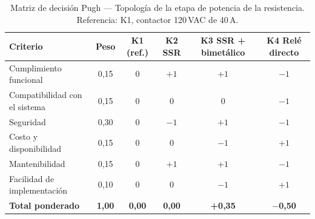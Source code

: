 \begin{table}[H]
\centering
\caption{Matriz de decisión Pugh --- Topología de la etapa de potencia de la resistencia. Referencia: K1, contactor 120\,VAC de 40\,A.}
\label{tab:pugh-potencia}
\begin{tabularx}{\textwidth}{Xccccc}
\toprule
\textbf{Criterio} & \textbf{Peso} & \textbf{K1 (ref.)} & \textbf{K2 SSR} & \textbf{K3 SSR + bimetálico} & \textbf{K4 Relé directo} \\
\midrule
Cumplimiento funcional        & 0,15 & 0 & $+1$ & $+1$ & $-1$ \\
Compatibilidad con el sistema & 0,15 & 0 & 0    & 0    & $-1$ \\
Seguridad                     & 0,30 & 0 & $-1$ & $+1$ & $-1$ \\
Costo y disponibilidad        & 0,15 & 0 & 0    & $-1$ & $+1$ \\
Mantenibilidad                & 0,15 & 0 & $+1$ & $+1$ & $-1$ \\
Facilidad de implementación   & 0,10 & 0 & 0    & $-1$ & $+1$ \\
\midrule
\textbf{Total ponderado}      & \textbf{1,00} & \textbf{0,00} & \textbf{0,00} & \textbf{+0,35} & \textbf{$-$0,50} \\
\bottomrule
\end{tabularx}
\end{table}
